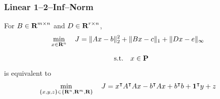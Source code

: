 \documentclass{article}
\begin{document}
\subsubsection{Linear 1--2--Inf--Norm}

    For $B\in\textbf{R}^{m\times n}$ and $D\in\textbf{R}^{r\times n}$,
    \begin{align*}
        \min_{x\in\textbf{R}^n}\quad J & =     \|A x-b\|_2^2
                        +   \|B x - c\|_1
                        +   \|D x - e \|_\infty
    \end{align*}

    \begin{align*}
        \text{s.t.}\quad x\in\textbf{P}
    \end{align*}
    is equivalent to
    \begin{align*}
    \min_{\{x,y,z\}\in\{\textbf{R}^n,\textbf{R}^m,\textbf{R}\}}
    \quad J & =     x^\intercal A^\intercal A x 
                    -   b^\intercal A x
                    +   b^\intercal b
                    +   \textbf{1}^\intercal y +z
    \end{align*}
\end{document}

